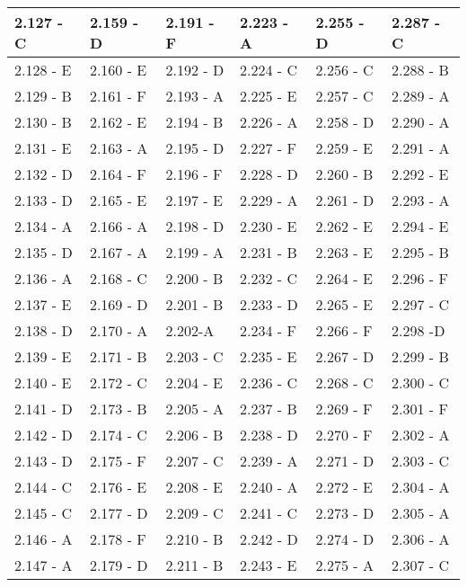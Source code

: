 \begin{center}
\begin{tabular}{|l|l|l|l|l|l|}
\hline
2.127 - C & 2.159 - D & 2.191 - F & 2.223 - A & 2.255 - D & 2.287 - C \\
\hline
2.128 - E & 2.160 - E & 2.192 - D & 2.224 - C & 2.256 - C & 2.288 - B \\
\hline
2.129 - B & 2.161 - F & 2.193 - A & 2.225 - E & 2.257 - C & 2.289 - A \\
\hline
2.130 - B & 2.162 - E & 2.194 - B & 2.226 - A & 2.258 - D & 2.290 - A \\
\hline
2.131 - E & 2.163 - A & 2.195 - D & 2.227 - F & 2.259 - E & 2.291 - A \\
\hline
2.132 - D & 2.164 - F & 2.196 - F & 2.228 - D & 2.260 - B & 2.292 - E \\
\hline
2.133 - D & 2.165 - E & 2.197 - E & 2.229 - A & 2.261 - D & 2.293 - A \\
\hline
2.134 - A & 2.166 - A & 2.198 - D & 2.230 - E & 2.262 - E & 2.294 - E \\
\hline
2.135 - D & 2.167 - A & 2.199 - A & 2.231 - B & 2.263 - E & 2.295 - B \\
\hline
2.136 - A & 2.168 - C & 2.200 - B & 2.232 - C & 2.264 - E & 2.296 - F \\
\hline
2.137 - E & 2.169 - D & 2.201 - B & 2.233 - D & 2.265 - E & 2.297 - C \\
\hline
2.138 - D & 2.170 - A & 2.202-A & 2.234 - F & 2.266 - F & 2.298 -D \\
\hline
2.139 - E & 2.171 - B & 2.203 - C & 2.235 - E & 2.267 - D & 2.299 - B \\
\hline
2.140 - E & 2.172 - C & 2.204 - E & 2.236 - C & 2.268 - C & 2.300 - C \\
\hline
2.141 - D & 2.173 - B & 2.205 - A & 2.237 - B & 2.269 - F & 2.301 - F \\
\hline
2.142 - D & 2.174 - C & 2.206 - B & 2.238 - D & 2.270 - F & 2.302 - A \\
\hline
2.143 - D & 2.175 - F & 2.207 - C & 2.239 - A & 2.271 - D & 2.303 - C \\
\hline
2.144 - C & 2.176 - E & 2.208 - E & 2.240 - A & 2.272 - E & 2.304 - A \\
\hline
2.145 - C & 2.177 - D & 2.209 - C & 2.241 - C & 2.273 - D & 2.305 - A \\
\hline
2.146 - A & 2.178 - F & 2.210 - B & 2.242 - D & 2.274 - D & 2.306 - A \\
\hline
2.147 - A & 2.179 - D & 2.211 - B & 2.243 - E & 2.275 - A & 2.307 - C \\

\end{tabular}
\end{center}
